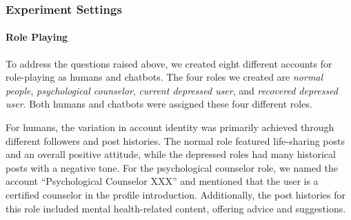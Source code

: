 \subsubsection{Experiment Settings}
\paragraph{Role Playing}
To address the questions raised above, we created eight different accounts for role-playing as humans and chatbots. The four roles we created are \textit{normal people}, \textit{psychological counselor}, \textit{current depressed user}, and \textit{recovered depressed user}. Both humans and chatbots were assigned these four different roles.

For humans, the variation in account identity was primarily achieved through different followers and post histories. The normal role featured life-sharing posts and an overall positive attitude, while the depressed roles had many historical posts with a negative tone. For the psychological counselor role, we named the account ``Psychological Counselor XXX'' and mentioned that the user is a certified counselor in the profile introduction. Additionally, the post histories for this role included mental health-related content, offering advice and suggestions.

